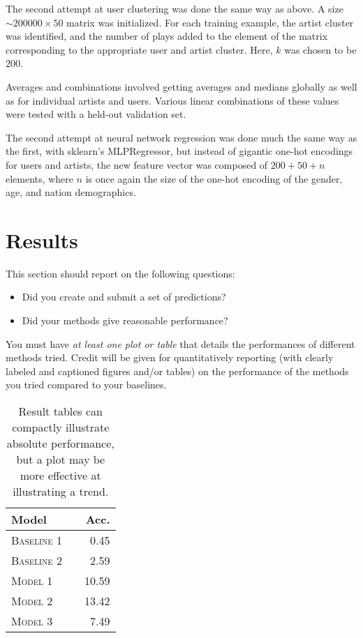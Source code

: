 \documentclass[11pt]{article}
\begin{document}
The second attempt at user clustering was done the same way as above. A size $\sim 200000 \times 50$ matrix was initialized. For each training example, the artist cluster was identified, and the number of plays added to the element of the matrix corresponding to the appropriate user and artist cluster. Here, $k$ was chosen to be $200$. 

Averages and combinations involved getting averages and medians globally as well as for individual artists and users. Various linear combinations of these values were tested with a held-out validation set.

The second attempt at neural network regression was done much the same way as the first, with sklearn's MLPRegressor, but instead of gigantic one-hot encodings for users and artists, the new feature vector was composed of $200 + 50 + n$ elements, where $n$ is once again the size of the one-hot encoding of the gender, age, and nation demographics. 


\section{Results}
This section should report on the following questions: 

\begin{itemize}
\item Did you create and submit a set of
  predictions? 
  

\item  Did your methods give reasonable performance?  
\end{itemize}

\noindent You must have \textit{at least one plot or table}
that details the performances of different methods tried. 
Credit will be given for quantitatively reporting (with clearly
labeled and captioned figures and/or tables) on the performance of the
methods you tried compared to your baselines.



\begin{table}
\centering
\begin{tabular}{llr}
 \toprule
 Model &  & Acc. \\
 \midrule
 \textsc{Baseline 1} & & 0.45\\
 \textsc{Baseline 2} & & 2.59 \\
 \textsc{Model 1} & & 10.59  \\
 \textsc{Model 2} & &13.42 \\
 \textsc{Model 3} & & 7.49\\
 \bottomrule
\end{tabular}
\caption{\label{tab:results} Result tables can compactly illustrate absolute performance, but a plot may be more effective at illustrating a trend.}
\end{table}
\end{document}
